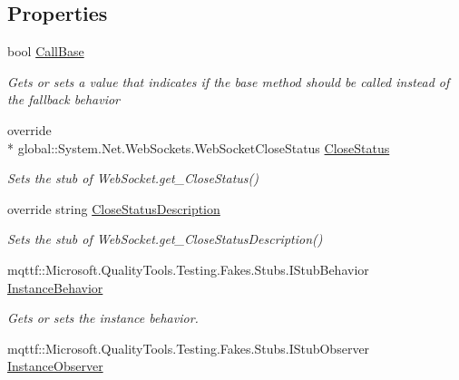 \subsection*{Properties}
\begin{DoxyCompactItemize}
\item 
bool \hyperlink{class_system_1_1_net_1_1_web_sockets_1_1_fakes_1_1_stub_web_socket_ac732b40ae48b3713f2c28165f8ae10c4}{Call\-Base}
\begin{DoxyCompactList}\small\item\em Gets or sets a value that indicates if the base method should be called instead of the fallback behavior\end{DoxyCompactList}\item 
override \\*
global\-::\-System.\-Net.\-Web\-Sockets.\-Web\-Socket\-Close\-Status \hyperlink{class_system_1_1_net_1_1_web_sockets_1_1_fakes_1_1_stub_web_socket_a9bc11940cf54a3c6cc0805a300d4a9a0}{Close\-Status}
\begin{DoxyCompactList}\small\item\em Sets the stub of Web\-Socket.\-get\-\_\-\-Close\-Status()\end{DoxyCompactList}\item 
override string \hyperlink{class_system_1_1_net_1_1_web_sockets_1_1_fakes_1_1_stub_web_socket_abb69af6d63e17aee0a5d41e5b775836a}{Close\-Status\-Description}
\begin{DoxyCompactList}\small\item\em Sets the stub of Web\-Socket.\-get\-\_\-\-Close\-Status\-Description()\end{DoxyCompactList}\item 
mqttf\-::\-Microsoft.\-Quality\-Tools.\-Testing.\-Fakes.\-Stubs.\-I\-Stub\-Behavior \hyperlink{class_system_1_1_net_1_1_web_sockets_1_1_fakes_1_1_stub_web_socket_acdf00110c0586682ca3f89530965c1ec}{Instance\-Behavior}
\begin{DoxyCompactList}\small\item\em Gets or sets the instance behavior.\end{DoxyCompactList}\item 
mqttf\-::\-Microsoft.\-Quality\-Tools.\-Testing.\-Fakes.\-Stubs.\-I\-Stub\-Observer \hyperlink{class_system_1_1_net_1_1_web_sockets_1_1_fakes_1_1_stub_web_socket_a649ceaff825fb3c465ada3caa0ccc787}{Instance\-Observer}

\end{DoxyCompactItemize}
